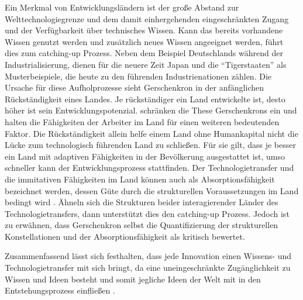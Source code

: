 Ein Merkmal von Entwicklungsl{\"a}ndern ist der gro{\ss}e Abstand zur Welttechnologiegrenze und dem damit einhergehenden eingeschr{\"a}nkten Zugang und der Verf{\"u}gbarkeit {\"u}ber technisches Wissen. Kann das bereits vorhandene Wissen genutzt werden und zus{\"a}tzlich neues Wissen angeeignet werden, f{\"u}hrt dies zum catching-up Prozess. Neben dem Beispiel Deutschlands w{\"a}hrend der Industrialisierung, dienen f{\"u}r die neuere Zeit Japan und die "`Tigerstaaten"' als Musterbeispiele, die heute zu den f{\"u}hrenden Industrienationen z{\"a}hlen. Die Ursache f{\"u}r diese Aufholprozesse sieht Gerschenkron in der anf{\"a}nglichen R{\"u}ckst{\"a}ndigkeit eines Landes. Je r{\"u}ckst{\"a}ndiger ein Land entwickelte ist, desto h{\"o}her ist sein Entwicklungspotenzial. \citet{Nelson.1966}  schr{\"a}nken die These Gerschenkrons ein und halten die F{\"a}higkeiten der Arbeiter im Land f{\"u}r einen weiteren bedeutenden Faktor. Die R{\"u}ckst{\"a}ndigkeit allein helfe einem Land ohne Humankapital nicht die L{\"u}cke zum technologisch f{\"u}hrenden Land zu schlie{\ss}en. F{\"u}r sie gilt, dass je besser ein Land mit adaptiven F{\"a}higkeiten in der Bev{\"o}lkerung ausgestattet ist, umso schneller kann der Entwicklungsprozess stattfinden. Der Technologietransfer und die immitativen F{\"a}higkeiten im Land k{\"o}nnen auch als Absorptionsf{\"a}higkeit bezeichnet werden, dessen G{\"u}te durch die strukturellen Voraussetzungen im Land bedingt wird \citep{Abramovitz.1986}. {\"A}hneln sich die Strukturen beider interagierender L{\"a}nder des Technologietransfers, dann unterst{\"u}tzt dies den catching-up Prozess. Jedoch ist zu erw{\"a}hnen, dass Gerschenkron selbst die Quantifizierung der strukturellen Konstellationen und der Absorptionsf{\"a}higkeit als kritisch bewertet.\newline 


Zusammenfassend l{\"a}sst sich festhalten, dass jede Innovation einen Wissens- und Technologietransfer mit sich bringt, da eine uneingeschr{\"a}nkte Zug{\"a}nglichkeit zu Wissen und Ideen besteht und somit jegliche Ideen der Welt mit in den Entstehungsprozess einflie{\ss}en \cite{Gerschenkron.1962}.



